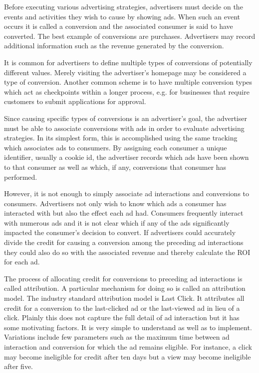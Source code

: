\documentclass{article}
\begin{document}
Before executing various advertising strategies, advertisers must decide on the events and activities they wish to cause by showing ads. When such an event occurs it is called a conversion and the associated consumer is said to have converted. The best example of conversions are purchases. Advertisers may record additional information such as the revenue generated by the conversion.

It is common for advertisers to define multiple types of conversions of potentially different values. Merely visiting the advertiser's homepage may be considered a type of conversion. Another common scheme is to have multiple conversion types which act as checkpoints within a longer process, e.g. for businesses that require customers to submit applications for approval.

Since causing specific types of conversions is an advertiser's goal, the advertiser must be able to associate conversions with ads in order to evaluate advertising strategies. In its simplest form, this is accomplished using the same tracking which associates ads to consumers. By assigning each consumer a unique identifier, usually a cookie id, the advertiser records which ads have been shown to that consumer as well as which, if any, conversions that consumer has performed.

However, it is not enough to simply associate ad interactions and conversions to consumers. Advertisers not only wish to know which ads a consumer has interacted with but also the effect each ad had. Consumers frequently interact with numerous ads and it is not clear which if any of the ads significantly impacted the consumer's decision to convert. If advertisers could accurately divide the credit for causing a conversion among the preceding ad interactions they could also do so with the associated revenue and thereby calculate the ROI for each ad.

The process of allocating credit for conversions to preceding ad interactions is called attribution. A particular mechanism for doing so is called an attribution model. The industry standard attribution model is Last Click. It attributes all credit for a conversion to the last-clicked ad or the last-viewed ad in lieu of a click. Plainly this does not capture the full detail of ad interaction but it has some motivating factors. It is very simple to understand as well as to implement. Variations include few parameters such as the maximum time between ad interaction and conversion for which the ad remains eligible. For instance, a click may become ineligible for credit after ten days but a view may become ineligible after five.
\end{document}
